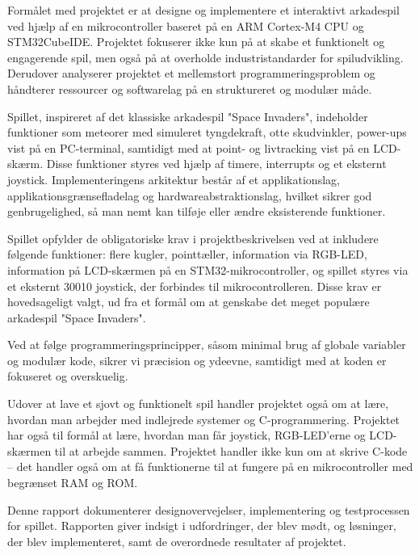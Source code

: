 Formålet med projektet er at designe og implementere et interaktivt arkadespil ved hjælp af en mikrocontroller baseret på en ARM Cortex-M4 CPU og STM32CubeIDE. Projektet fokuserer ikke kun på at skabe et funktionelt og engagerende spil, men også på at overholde industristandarder for spiludvikling. Derudover analyserer projektet et mellemstort programmeringsproblem og håndterer ressourcer og softwarelag på en struktureret og modulær måde.

Spillet, inspireret af det klassiske arkadespil "Space Invaders", indeholder funktioner som meteorer med simuleret tyngdekraft, otte skudvinkler, power-ups vist på en PC-terminal, samtidigt med at point- og livtracking vist på en LCD-skærm. Disse funktioner styres ved hjælp af timere, interrupts og et eksternt joystick. Implementeringens arkitektur består af et applikationslag, applikationsgrænsefladelag og hardwareabstraktionslag, hvilket sikrer god genbrugelighed, så man nemt kan tilføje eller ændre eksisterende funktioner.

Spillet opfylder de obligatoriske krav i projektbeskrivelsen ved at inkludere følgende funktioner: flere kugler, pointtæller, information via RGB-LED, information på LCD-skærmen på en STM32-mikrocontroller, og spillet styres via et eksternt 30010 joystick, der forbindes til mikrocontrolleren. Disse krav er hovedsageligt valgt, ud fra et formål om at genskabe det meget populære arkadespil "Space Invaders".

Ved at følge programmeringsprincipper, såsom minimal brug af globale variabler og modulær kode, sikrer vi præcision og ydeevne, samtidigt med at koden er fokuseret og overskuelig.

Udover at lave et sjovt og funktionelt spil handler projektet også om at lære, hvordan man arbejder med indlejrede systemer og C-programmering. Projektet har også til formål at lære, hvordan man får joystick, RGB-LED'erne og LCD-skærmen til at arbejde sammen. Projektet handler ikke kun om at skrive C-kode – det handler også om at få funktionerne til at fungere på en mikrocontroller med begrænset RAM og ROM.

Denne rapport dokumenterer designovervejelser, implementering og testprocessen for spillet. Rapporten giver indsigt i udfordringer, der blev mødt, og løsninger, der blev implementeret, samt de overordnede resultater af projektet.